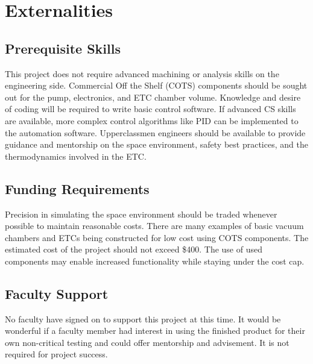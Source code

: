 \documentclass[conference]{IEEEtran} %
\begin{document}
\section{Externalities}
\subsection{Prerequisite Skills}
  This project does not require advanced machining or analysis skills on the engineering side. Commercial Off the Shelf (COTS) components should be sought out for the pump, electronics, and ETC chamber volume.
  Knowledge and desire of coding will be required to write basic control software. If advanced CS skills are available, more complex control algorithms like PID can be implemented to the automation software.
  Upperclassmen engineers should be available to provide guidance and mentorship on the space environment, safety best practices, and the thermodynamics involved in the ETC.
  

\subsection{Funding Requirements}
  Precision in simulating the space environment should be traded whenever possible to maintain reasonable costs. There are many examples of basic vacuum chambers and ETCs being constructed for low cost using COTS components. The estimated cost of the project should not exceed \$400. The use of used components may enable increased functionality while staying under the cost cap.

\subsection{Faculty Support}
  No faculty have signed on to support this project at this time. It would be wonderful if a faculty member had interest in using the finished product for their own non-critical testing and could offer mentorship and advisement. It is not required for project success.
\end{document}

